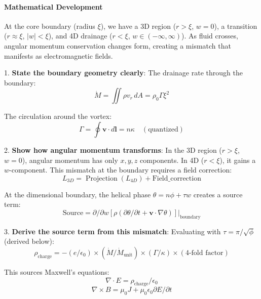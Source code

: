 \paragraph{Mathematical Development}

At the core boundary (radius $\xi$), we have a 3D region ($r > \xi$, $w = 0$), a transition ($r \approx \xi$, $|w| < \xi$), and 4D drainage ($r < \xi$, $w \in (-\infty,\infty)$). As fluid crosses, angular momentum conservation changes form, creating a mismatch that manifests as electromagnetic fields.

1. \textbf{State the boundary geometry clearly}: The drainage rate through the boundary:
\begin{equation}
\dot{M} = \iint \rho v_r \, dA = \rho_0 \Gamma \xi^2
\end{equation}

The circulation around the vortex:
\begin{equation}
\Gamma = \oint \mathbf{v} \cdot d\mathbf{l} = n\kappa  \quad (\text{quantized})
\end{equation}

2. \textbf{Show how angular momentum transforms}: In the 3D region ($r > \xi$, $w = 0$), angular momentum has only $x,y,z$ components. In 4D ($r < \xi$), it gains a $w$-component. This mismatch at the boundary requires a field correction:
\begin{equation}
L_{3D} = \operatorname{Projection}(L_{4D}) + \text{Field\_correction}
\end{equation}

At the dimensional boundary, the helical phase $\theta = n\phi + \tau w$ creates a source term:
\begin{equation}
\text{Source} = \partial / \partial w [\rho(\partial \theta / \partial t + \mathbf{v} \cdot \nabla \theta)]|_{\text{boundary}}
\end{equation}

3. \textbf{Derive the source term from this mismatch}: Evaluating with $\tau = \pi/\sqrt{\phi}$ (derived below):
\begin{equation}
\rho_{\text{charge}} = -(e/\epsilon_0) \times (\dot{M}/\dot{M}_{\text{unit}}) \times (\Gamma/\kappa) \times (4\text{-fold factor})
\end{equation}

This sources Maxwell's equations:
\begin{equation}
\nabla \cdot E = \rho_{\text{charge}} / \epsilon_0
\end{equation}
\begin{equation}
\nabla \times B = \mu_0 J + \mu_0 \epsilon_0 \partial E / \partial t
\end{equation}

